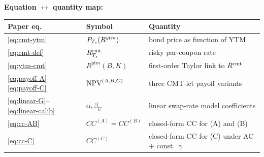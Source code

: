 \documentclass[11pt,a4paper]{article}
\begin{document}
\begin{validation}
\textbf{Equation $\leftrightarrow$ quantity map:}

\smallskip
\begin{tabular}{@{}p{2.8cm}p{3.8cm}p{6.2cm}@{}}
\toprule
Paper eq.                & Symbol                                 & Quantity \\
\midrule
\eqref{eq:cmt-ytm}       & $P_{T_s}(R^{ytm})$                  & bond price as function of YTM \\
\eqref{eq:cmt-def}       & $R^{\mathrm{cmt}}_{T_s}$                          & risky par-coupon rate \\
\eqref{eq:ytm-cmt}       & $R^{ytm}(B, K)$                        & first-order Taylor link to $R^{\mathrm{cmt}}$ \\
\eqref{eq:payoff-A}--\eqref{eq:payoff-C} & $\mathrm{NPV}^{(A,B,C)}$       & three CMT-let payoff variants \\
\eqref{eq:linear-G}--\eqref{eq:linear-calib} & $\alpha, \beta_U$  & linear swap-rate model coefficients \\
\eqref{eq:cc-AB}         & $CC^{(A)} = CC^{(B)}$                  & closed-form CC for (A) and (B) \\
\eqref{eq:cc-C}          & $CC^{(C)}$                             & closed-form CC for (C) under AC + const.\ $\gamma$ \\
\bottomrule
\end{tabular}
\smallskip


\end{validation}
\end{document}
